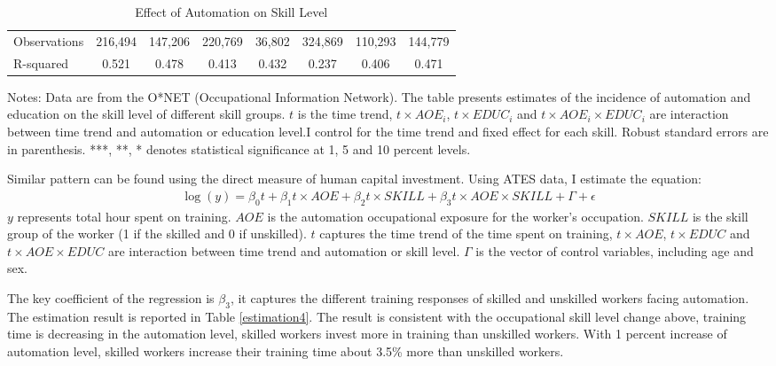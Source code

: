 \documentclass[12pt]{article}
\begin{document}
\begin{table}[h!]
\begin{center}
\begin{tabular}{lccccccc}
Observations & 216,494 & 147,206 & 220,769 & 36,802 & 324,869 & 110,293 & 144,779 \\
 R-squared & 0.521 & 0.478 & 0.413 & 0.432 & 0.237 & 0.406 & 0.471 \\ \hline
\end{tabular}
\end{center}
\caption{Effect of Automation on Skill Level}
\label{estimation3}
{\scriptsize Notes: Data are from the O*NET (Occupational Information Network). The table presents estimates of the incidence of automation and education on the skill level of different skill groups. $t$ is the time trend, $t\times AOE_{i}$, $t\times EDUC_{i}$ and $t\times AOE_{i}\times EDUC_{i}$ are interaction between time trend and automation or education level.I control for the time trend and fixed effect for each skill. Robust standard errors are in parenthesis. ***, **, * denotes statistical significance at 1, 5 and 10 percent levels.}
\end{table}

Similar pattern can be found using the direct measure of human capital investment. Using ATES data, I estimate the equation: 
\begin{align}
\log (y) = \beta_0 t +\beta_1 t \times AOE + \beta_2 t \times SKILL +\beta_3 t \times AOE \times SKILL + \Gamma + \epsilon
\end{align}
$y$ represents total hour spent on training. $AOE$ is the automation occupational exposure for the worker's occupation. $SKILL$ is the skill group of the worker (1 if the skilled and 0 if unskilled). $t$ captures the time trend of the time spent on training, $t\times AOE$, $t\times EDUC$ and $t\times AOE\times EDUC$ are interaction between time trend and automation or skill level. $\Gamma$ is the vector of control variables, including age and sex. 

The key coefficient of the regression is $\beta_3$, it captures the different training responses of skilled and unskilled workers facing automation. The estimation result is reported in Table \ref{estimation4}. The result is consistent with the occupational skill level change above, training time is decreasing in the automation level, skilled workers invest more in training than unskilled workers. With 1 percent increase of automation level, skilled workers increase their training time about 3.5\% more than unskilled workers. 
\end{document}
